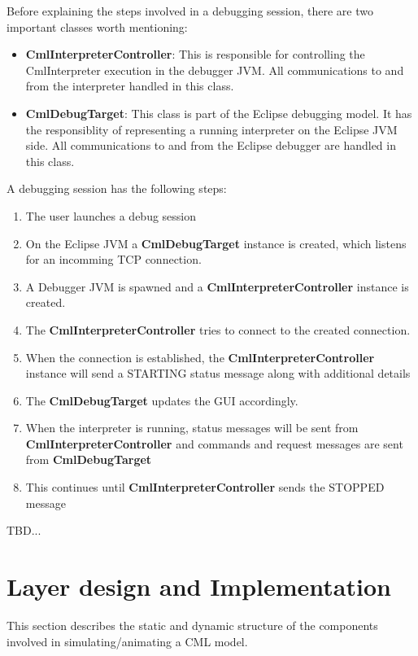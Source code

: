 \documentclass[a4paper, 10pt]{include/compassreport}   %
\begin{document}
Before explaining the steps involved in a debugging session, there are
two important classes worth mentioning:

\begin{itemize}
\item \textbf{CmlInterpreterController}: This is responsible for
  controlling the CmlInterpreter execution in the debugger JVM.  All
  communications to and from the interpreter handled in this class.
  
\item \textbf{CmlDebugTarget}: This class is part of the Eclipse
  debugging model. It has the responsiblity of representing a running
  interpreter on the Eclipse JVM side. All communications to and from
  the Eclipse debugger are handled in this class.
\end{itemize}

A debugging session has the following steps:
\begin{enumerate}
\item The user launches a debug session
\item On the Eclipse JVM a \textbf{CmlDebugTarget} instance is
  created, which listens for an incomming TCP connection.
\item A Debugger JVM is spawned and a
  \textbf{CmlInterpreterController} instance is created.
\item The \textbf{CmlInterpreterController} tries to connect to the
  created connection.
\item When the connection is established, the
  \textbf{CmlInterpreterController} instance will send a STARTING status
  message along with additional details
\item The \textbf{CmlDebugTarget} updates the GUI accordingly.
\item When the interpreter is running, status messages will be sent from \textbf{CmlInterpreterController} and commands and request messages are sent from \textbf{CmlDebugTarget}
\item This continues until \textbf{CmlInterpreterController} sends the STOPPED message
\end{enumerate}

TBD...

\section{Layer design and Implementation}
This section describes the static and dynamic structure of the
components involved in simulating/animating a CML model.
\end{document}
